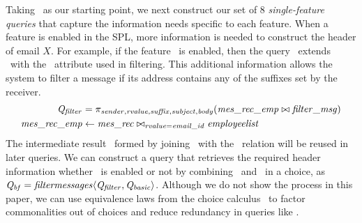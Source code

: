 Taking \Qbasic\ as our starting point, we next construct our set of $8$
\emph{single-feature queries} that capture the information needs specific to
each feature.
%
When a feature is enabled in the SPL, more information is needed to construct
the header of email $X$. For example, if the feature \filtermessages\ is
enabled, then the query \Qfilter\ extends \Qbasic\ with the \suffix\ attribute
used in filtering. This additional information allows the system to filter a
message if its address contains any of the suffixes set by the receiver.
%
%
\begin{align*}
\Qfilter &= 
\pi_{\sender,\rvalue,\suffix,\subject,\body} 
(\mretable \bowtie\filtermsg )\\
\mretable &\leftarrow \joinRel{\mrtable}{\employees}{\rvalue=\emailid}
\end{align*}
%
The intermediate result \mretable\ formed by joining \mrtable\ with the
\employees\ relation will be reused in later queries.
%
We can construct a query that retrieves the required header information whether
\filtermessages\ is enabled or not by combining \Qbasic\ and \Qfilter\ in a
choice, as $\Qbf=\chc[\filtermessages]{\Qfilter,\Qbasic}$. 
%
Although we do not show the process in this paper, we can use equivalence laws
from the choice calculus~\cite{EW11tosem,HW16fosd} to factor commonalities out
of choices and reduce redundancy in queries like \Qbf.




